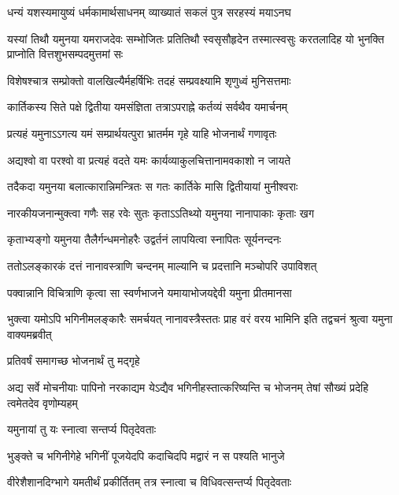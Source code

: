 \twolineshloka
{धन्यं यशस्यमायुष्यं धर्मकामार्थसाधनम्}
{व्याख्यातं सकलं पुत्र सरहस्यं मयाऽनघ} %

\twolineshloka
{यस्यां तिथौ यमुनया यमराजदेवः सम्भोजितः प्रतितिथौ स्वसृसौहृदेन}
{तस्मात्स्वसुः करतलादिह यो भुनक्ति प्राप्नोति वित्तशुभसम्पदमुत्तमां सः} %

\twolineshloka
{विशेषश्चात्र सम्प्रोक्तो वालखिल्यैर्महर्षिभिः}
{तदहं सम्प्रवक्ष्यामि शृणुध्वं मुनिसत्तमाः} %


\twolineshloka
{कार्तिकस्य सिते पक्षे द्वितीया यमसंज्ञिता}
{तत्राऽपराह्ने कर्तव्यं सर्वथैव यमार्चनम्} %

\twolineshloka
{प्रत्यहं यमुनाऽऽगत्य यमं सम्प्रार्थयत्पुरा}
{भ्रातर्मम गृहे याहि भोजनार्थं गणावृतः} %

\twolineshloka
{अद्यश्वो वा परश्वो वा प्रत्यहं वदते यमः}
{कार्यव्याकुलचित्तानामवकाशो न जायते} %

\twolineshloka
{तदैकदा यमुनया बलात्कारान्निमन्त्रितः}
{स गतः कार्तिके मासि द्वितीयायां मुनीश्वराः} %

\twolineshloka
{नारकीयजनान्मुक्त्वा गणैः सह रवेः सुतः}
{कृताऽऽतिथ्यो यमुनया नानापाकाः कृताः खग} %

\twolineshloka
{कृताभ्यङ्गो यमुनया तैलैर्गन्धमनोहरैः}
{उद्वर्तनं लापयित्वा स्नापितः सूर्यनन्दनः} %

\twolineshloka
{ततोऽलङ्कारकं दत्तं नानावस्त्राणि चन्दनम्}
{माल्यानि च प्रदत्तानि मञ्चोपरि उपाविशत्} %

\twolineshloka
{पक्वान्नानि विचित्राणि कृत्वा सा स्वर्णभाजने}
{यमायाभोजयद्देवी यमुना प्रीतमानसा} %

\threelineshloka
{भुक्त्वा यमोऽपि भगिनीमलङ्कारैः समर्चयत्}
{नानावस्त्रैस्ततः प्राह वरं वरय भामिनि}
{इति तद्वचनं श्रुत्वा यमुना वाक्यमब्रवीत्} %



\onelineshloka
{प्रतिवर्षं समागच्छ भोजनार्थं तु मद्गृहे} %

\threelineshloka
{अद्य सर्वे मोचनीयाः पापिनो नरकाद्यम}
{येऽद्यैव भगिनीहस्तात्करिष्यन्ति च भोजनम्}
{तेषां सौख्यं प्रदेहि त्वमेतदेव वृणोम्यहम्} %



\onelineshloka
{यमुनायां तु यः स्नात्वा सन्तर्प्य पितृदेवताः} %

\twolineshloka
{भुङ्क्ते च भगिनीगेहे भगिनीं पूजयेदपि}
{कदाचिदपि मद्वारं न स पश्यति भानुजे} %

\twolineshloka
{वीरेशैशानदिग्भागे यमतीर्थं प्रकीर्तितम्}
{तत्र स्नात्वा च विधिवत्सन्तर्प्य पितृदेवताः} %

